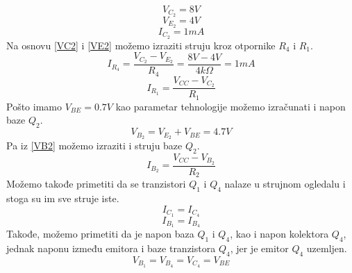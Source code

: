 \documentclass{article}
\begin{document}
            \begin{equation}
                \label{VC2}
                V_{C_2} = 8V
            \end{equation}
            \begin{equation}
                \label{VE2}
                V_{E_2} = 4V
            \end{equation}
            \begin{equation}
                \label{IC2}
                I_{C_2} = 1mA
            \end{equation}
            Na osnovu \eqref{VC2} i \eqref{VE2} možemo izraziti struju kroz otpornike $R_4$ i $R_1$.
            \begin{equation}
                \label{IR4}
                I_{R_4} = \frac{V_{C_2} - V_{E_2}}{R_4} = \frac{8V - 4V}{4k\Omega} = 1mA
            \end{equation}
            \begin{equation}
                \label{IR1}
                I_{R_1} = \frac{V_{CC} - V_{C_2}}{R_1}
            \end{equation}
            Pošto imamo $V_{BE} = 0.7V$ kao parametar tehnologije možemo izračunati i napon baze $Q_2$.
            \begin{equation}
                \label{VB2}
                V_{B_2} = V_{E_2} + V_{BE} = 4.7V
            \end{equation}
            Pa iz \eqref{VB2} možemo izraziti i struju baze $Q_2$.
            \begin{equation}
                \label{IB2}
                I_{B_2} = \frac{V_{CC} - V_{B_2}}{R_2}
            \end{equation}
            Možemo takođe primetiti da se tranzistori $Q_1$ i $Q_4$ nalaze u strujnom ogledalu i stoga su im sve struje iste.
            \begin{equation}
                \label{IC1}
                I_{C_1} = I_{C_4}
            \end{equation}
            \begin{equation}
                \label{IB1}
                I_{B_1} = I_{B_4}
            \end{equation}
            Takođe, možemo primetiti da je napon baza $Q_1$ i $Q_4$, kao i napon kolektora $Q_4$, jednak naponu između emitora i baze tranzistora $Q_4$, jer je emitor $Q_4$ uzemljen.
            \begin{equation}
                \label{VC4}
                V_{B_1} = V_{B_4} = V_{C_4} = V_{BE}
            \end{equation}
\end{document}
